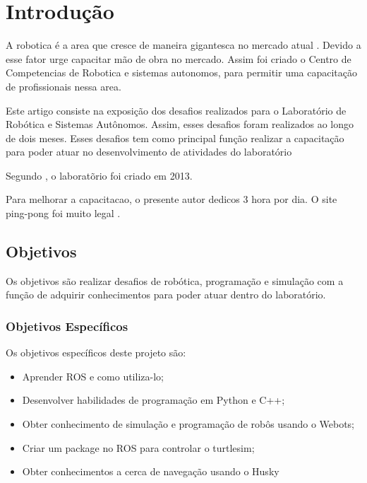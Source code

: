 \chapter{Introdução}
\label{chap:intro}

A robotica é a area que cresce de maneira gigantesca no mercado atual \cite{Robótica93:online}. Devido a esse fator urge capacitar mão de obra no mercado. Assim foi criado o Centro de Competencias de Robotica e sistemas autonomos, para permitir uma capacitação de profissionais nessa area.

Este artigo consiste na exposição dos desafios realizados para o Laboratório de Robótica e Sistemas Autônomos. Assim, esses desafios foram realizados ao longo de dois meses. Esses desafios tem como principal função realizar a capacitação para poder atuar no desenvolvimento de atividades do laboratório 

Segundo , o laboratõrio foi criado em 2013.

Para melhorar a capacitacao, o presente autor dedicos 3 hora por dia. O site ping-pong foi muito legal \cite{CursoPyt77:online}.




\section{Objetivos}
\label{sec:obj}
Os objetivos são realizar desafios de robótica, programação e simulação com a função de adquirir conhecimentos para poder atuar dentro do laboratório.
\label{sec:obj}

\subsection{Objetivos Específicos}
\label{ssec:objesp}
Os objetivos específicos deste projeto são:
\begin{itemize}
      \item Aprender ROS e como utiliza-lo;
      \item Desenvolver habilidades de programação em Python e C++;
      \item Obter conhecimento de simulação e programação de robôs usando o Webots;
      \item Criar um package no ROS para controlar o turtlesim;
      \item Obter conhecimentos a cerca de navegação usando o Husky
  \end{itemize}

